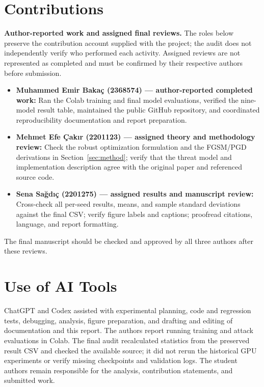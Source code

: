 \documentclass[11pt,a4paper]{article}
\newif\ifshowguides
\newcommand{\guide}[1]{%
  \ifshowguides
  \par\medskip\noindent
  \fcolorbox{guideframe}{guidebg}{%
    \begin{minipage}{\dimexpr\linewidth-2\fboxsep-2\fboxrule\relax}
      \small\textbf{Guide.}
      \begin{itemize}[leftmargin=1.2em,itemsep=1pt,topsep=2pt]
        #1
      \end{itemize}
    \end{minipage}}%
  \par\medskip
  \fi}
\begin{document}
\section*{Contributions}
\label{sec:contrib}
\textbf{Author-reported work and assigned final reviews.} The roles below preserve the contribution account supplied with the project; the audit does not independently verify who performed each activity. Assigned reviews are not represented as completed and must be confirmed by their respective authors before submission.
\begin{itemize}[leftmargin=1.5em]
\item \textbf{Muhammed Emir Baka\c{c} (2368574) --- author-reported completed work:} Ran the Colab training and final model evaluations, verified the nine-model result table, maintained the public GitHub repository, and coordinated reproducibility documentation and report preparation.
\item \textbf{Mehmet Efe \c{C}ak\i r (2201123) --- assigned theory and methodology review:} Check the robust optimization formulation and the FGSM/PGD derivations in Section~\ref{sec:method}; verify that the threat model and implementation description agree with the original paper and referenced source code.
\item \textbf{Sena Sa\u{g}d\i\c{c} (2201275) --- assigned results and manuscript review:} Cross-check all per-seed results, means, and sample standard deviations against the final CSV; verify figure labels and captions; proofread citations, language, and report formatting.
\end{itemize}
The final manuscript should be checked and approved by all three authors after these reviews.

\guide{
  \item Describe concretely what each member did (derivation, implementation, experiments, writing).
  \item Every member is expected to understand the whole project, not only their own part.
}

\section*{Use of AI Tools}
ChatGPT and Codex assisted with experimental planning, code and regression tests, debugging, analysis, figure preparation, and drafting and editing of documentation and this report. The authors report running training and attack evaluations in Colab. The final audit recalculated statistics from the preserved result CSV and checked the available source; it did not rerun the historical GPU experiments or verify missing checkpoints and validation logs. The student authors remain responsible for the analysis, contribution statements, and submitted work.
\end{document}
